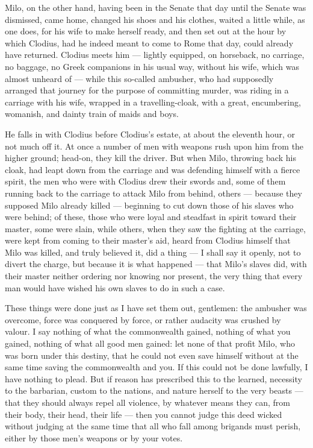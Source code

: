  Milo, on the other hand, having been in the Senate that day until the Senate was dismissed, came home, changed his shoes and his clothes, waited a little while, as one does, for his wife to make herself ready, and then set out at the hour by which Clodius, had he indeed meant to come to Rome that day, could already have returned. Clodius meets him --- lightly equipped, on horseback, no carriage, no baggage, no Greek companions in his usual way, without his wife, which was almost unheard of --- while this so-called ambusher, who had supposedly arranged that journey for the purpose of committing murder, was riding in a carriage with his wife, wrapped in a travelling-cloak, with a great, encumbering, womanish, and dainty train of maids and boys.

 He falls in with Clodius before Clodius's estate, at about the eleventh hour, or not much off it. At once a number of men with weapons rush upon him from the higher ground; head-on, they kill the driver. But when Milo, throwing back his cloak, had leapt down from the carriage and was defending himself with a fierce spirit, the men who were with Clodius drew their swords and, some of them running back to the carriage to attack Milo from behind, others --- because they supposed Milo already killed --- beginning to cut down those of his slaves who were behind; of these, those who were loyal and steadfast in spirit toward their master, some were slain, while others, when they saw the fighting at the carriage, were kept from coming to their master's aid, heard from Clodius himself that Milo was killed, and truly believed it, did a thing --- I shall say it openly, not to divert the charge, but because it is what happened --- that Milo's slaves did, with their master neither ordering nor knowing nor present, the very thing that every man would have wished his own slaves to do in such a case.

 These things were done just as I have set them out, gentlemen: the ambusher was overcome, force was conquered by force, or rather audacity was crushed by valour. I say nothing of what the commonwealth gained, nothing of what you gained, nothing of what all good men gained: let none of that profit Milo, who was born under this destiny, that he could not even save himself without at the same time saving the commonwealth and you. If this could not be done lawfully, I have nothing to plead. But if reason has prescribed this to the learned, necessity to the barbarian, custom to the nations, and nature herself to the very beasts --- that they should always repel all violence, by whatever means they can, from their body, their head, their life --- then you cannot judge this deed wicked without judging at the same time that all who fall among brigands must perish, either by those men's weapons or by your votes.

